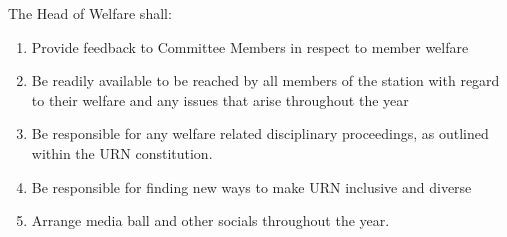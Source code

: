 \item The Head of Welfare shall:
\begin{enumerate}[label*=\arabic*.]
    \item Provide feedback to Committee Members in respect to member welfare
    \item Be readily available to be reached by all members of the station with regard to their welfare and any issues that arise throughout the year
    \item Be responsible for any welfare related disciplinary proceedings, as outlined within the URN constitution.
    \item Be responsible for finding new ways to make URN inclusive and diverse
    \item Arrange media ball and other socials throughout the year.
\end{enumerate}
